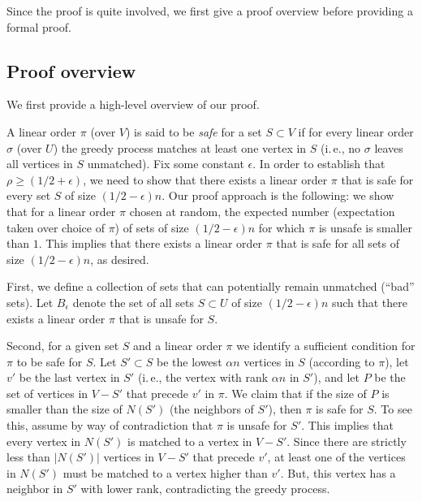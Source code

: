 \documentclass[11pt]{article}
\numberwithin{equation}{section}
\theoremstyle{definition}
\theoremstyle{plain}
\newcommand{\ie}{i.\,e.}
\theoremstyle{plain}
\begin{document}
%
Since the proof is quite involved, we first give a proof overview before providing a formal proof. 

%
%
%
%

\subsection{Proof overview}
\label{sec:proof-overview}

We first provide a high-level %
overview of our proof.  %
%

A linear order $\pi$ (over $V$) is said to be \emph{safe} for a set $S \subset V$ if for every linear order $\sigma$ (over $U$) the greedy process matches at least one vertex in $S$ (\ie, no $\sigma$ leaves all vertices in $S$ unmatched).
Fix some constant $\epsilon$. In order to establish that $\rho \geq (1/2 + \epsilon)$, we need to show that there exists a linear order $\pi$ that is safe for every set $S$ of size $(1/2-\epsilon)n$.
Our proof approach is the following: we show that for a linear order $\pi$ chosen
%
at random, the expected number (expectation taken over choice of $\pi$) of sets of size $(1/2-\epsilon)n$ for which $\pi$ is unsafe is smaller than $1$.
This implies that there exists a linear order $\pi$ that is safe for all sets of size $(1/2-\epsilon)n$, as desired.

First, we define a collection of sets that can potentially remain unmatched (``bad'' sets).
%
%
%
Let $B_\epsilon$ denote the set of all sets $S \subset U$ of size $(1/2-\epsilon)n$ such that there exists a linear order $\pi$ that is unsafe for $S$.

Second, for a given set $S$ and a linear order $\pi$ we identify a sufficient condition for $\pi$ to be safe for $S$.
Let $S' \subset S$ be the lowest $\alpha n$ vertices in $S$ (according to $\pi$), let $v'$ be the last vertex in $S'$ (\ie, the vertex with rank $\alpha n$ in $S'$), and let $P$ be the set of vertices in $V - S'$ that precede $v'$ in $\pi$.
%
We claim that if the size of $P$ is smaller than the size of $N(S')$ (the neighbors of $S'$), then $\pi$ is safe for $S$.
To see this, assume by way of contradiction that $\pi$ is unsafe for $S'$.
This implies that every vertex in $N(S')$ is matched to a vertex in $V - S'$.
Since there are strictly less than $|N(S')|$ vertices in $V - S'$ that precede $v'$, at least one of the vertices in $N(S')$ must be matched to a vertex higher than $v'$. But, this vertex has a neighbor in $S'$ with lower rank, contradicting the greedy process.
\end{document}
